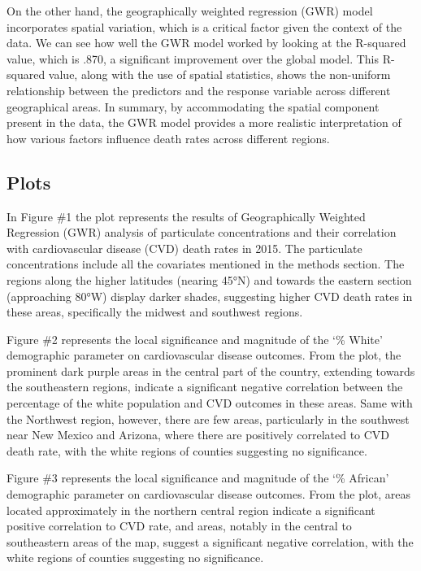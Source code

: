 \documentclass[
]{article}
\begin{document}
On the other hand, the geographically weighted regression (GWR) model
incorporates spatial variation, which is a critical factor given the
context of the data. We can see how well the GWR model worked by looking
at the R-squared value, which is .870, a significant improvement over
the global model. This R-squared value, along with the use of spatial
statistics, shows the non-uniform relationship between the predictors
and the response variable across different geographical areas. In
summary, by accommodating the spatial component present in the data, the
GWR model provides a more realistic interpretation of how various
factors influence death rates across different regions.

\subsection{Plots}\label{plots}

In Figure \#1 the plot represents the results of Geographically Weighted
Regression (GWR) analysis of particulate concentrations and their
correlation with cardiovascular disease (CVD) death rates in 2015. The
particulate concentrations include all the covariates mentioned in the
methods section. The regions along the higher latitudes (nearing 45°N)
and towards the eastern section (approaching 80°W) display darker
shades, suggesting higher CVD death rates in these areas, specifically
the midwest and southwest regions.

Figure \#2 represents the local significance and magnitude of the `\%
White' demographic parameter on cardiovascular disease outcomes. From
the plot, the prominent dark purple areas in the central part of the
country, extending towards the southeastern regions, indicate a
significant negative correlation between the percentage of the white
population and CVD outcomes in these areas. Same with the Northwest
region, however, there are few areas, particularly in the southwest near
New Mexico and Arizona, where there are positively correlated to CVD
death rate, with the white regions of counties suggesting no
significance.

Figure \#3 represents the local significance and magnitude of the `\%
African' demographic parameter on cardiovascular disease outcomes. From
the plot, areas located approximately in the northern central region
indicate a significant positive correlation to CVD rate, and areas,
notably in the central to southeastern areas of the map, suggest a
significant negative correlation, with the white regions of counties
suggesting no significance.
\end{document}
